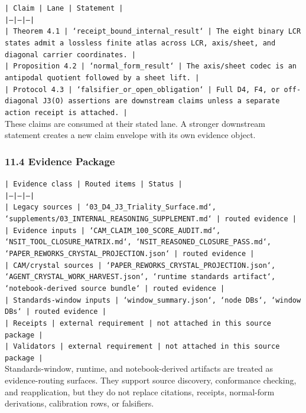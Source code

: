\documentclass[11pt]{article}
\begin{document}
\noindent\texttt{| Claim | Lane | Statement |}\\
\noindent\texttt{|---|---|---|}\\
\noindent\texttt{| Theorem 4.1 | `receipt\_bound\_internal\_result` | The eight binary LCR states admit a lossless finite atlas across LCR, axis/sheet, and diagonal carrier coordinates. |}\\
\noindent\texttt{| Proposition 4.2 | `normal\_form\_result` | The axis/sheet codec is an antipodal quotient followed by a sheet lift. |}\\
\noindent\texttt{| Protocol 4.3 | `falsifier\_or\_open\_obligation` | Full D4, F4, or off-diagonal J3(O) assertions are downstream claims unless a separate action receipt is attached. |}\\

These claims are consumed at their stated lane. A stronger downstream statement
creates a new claim envelope with its own evidence object.

\subsubsection*{11.4 Evidence Package}

\noindent\texttt{| Evidence class | Routed items | Status |}\\
\noindent\texttt{|---|---|---|}\\
\noindent\texttt{| Legacy sources | `03\_D4\_J3\_Triality\_Surface.md`, `supplements/03\_INTERNAL\_REASONING\_SUPPLEMENT.md` | routed evidence |}\\
\noindent\texttt{| Evidence inputs | `CAM\_CLAIM\_100\_SCORE\_AUDIT.md`, `NSIT\_TOOL\_CLOSURE\_MATRIX.md`, `NSIT\_REASONED\_CLOSURE\_PASS.md`, `PAPER\_REWORKS\_CRYSTAL\_PROJECTION.json` | routed evidence |}\\
\noindent\texttt{| CAM/crystal sources | `PAPER\_REWORKS\_CRYSTAL\_PROJECTION.json`, `AGENT\_CRYSTAL\_WORK\_HARVEST.json`, `runtime standards artifact`, `notebook-derived source bundle` | routed evidence |}\\
\noindent\texttt{| Standards-window inputs | `window\_summary.json`, `node DBs`, `window DBs` | routed evidence |}\\
\noindent\texttt{| Receipts | external requirement | not attached in this source package |}\\
\noindent\texttt{| Validators | external requirement | not attached in this source package |}\\

Standards-window, runtime, and notebook-derived artifacts are treated
as evidence-routing surfaces. They support source discovery, conformance
checking, and reapplication, but they do not replace citations, receipts,
normal-form derivations, calibration rows, or falsifiers.
\end{document}
